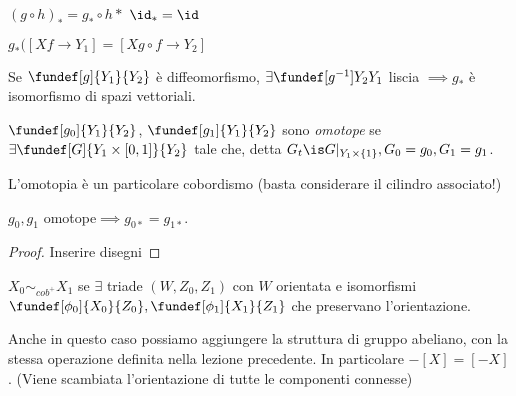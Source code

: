 
\begin{oss}
 $(g\circ h )_* = g_*\circ h*$
 $\id_* = \id$
\end{oss}
$g_*(\left[ X f\rightarrow Y_1 \right] = \left[X g\circ f \rightarrow Y_2 \right]$
\begin{oss}
 Se $\fundef[g]{Y_1}{Y_2}$ è diffeomorfismo, $\exists \fundef[g^{-1}]{Y_2}{Y_1}$ liscia $\implies g_*$ è isomorfismo di spazi vettoriali.
\end{oss}
\begin{defn}[Omotopia]
 $\fundef[g_0]{Y_1}{Y_2}$, $\fundef[g_1]{Y_1}{Y_2}$ sono \emph{omotope} se $\exists \fundef[G]{Y_1\times\left[ 0,1\right]}{Y_2}$ tale che,
 detta $G_t\is  G|_{Y_1\times \left \{ 1\right \}}, G_0=g_0, G_1=g_1$.
\end{defn}
 \begin{oss}
  L'omotopia è un particolare cobordismo (basta considerare il cilindro associato!)
 \end{oss}
\begin{prop}
 $g_0, g_1$ omotope$\implies g_{0*}=g_{1*}$.
\end{prop}
\begin{proof}
 Inserire disegni
\end{proof}
\begin{defn}
 $X_0\sim_{cob^+}X_1$ se $\exists$ triade $(W, Z_0, Z_1)$ con $W$ orientata e isomorfismi $\fundef[\phi_0]{X_0}{Z_0}, \fundef[\phi_1]{X_1}{Z_1}$
 che preservano l'orientazione.
\end{defn}
\begin{oss}
 Anche in questo caso possiamo aggiungere la struttura di gruppo abeliano, con la stessa operazione definita nella lezione precedente.
 In particolare $-\left[ X\right]=\left[-X\right]$. (Viene scambiata l'orientazione di tutte le componenti connesse)
\end{oss}
